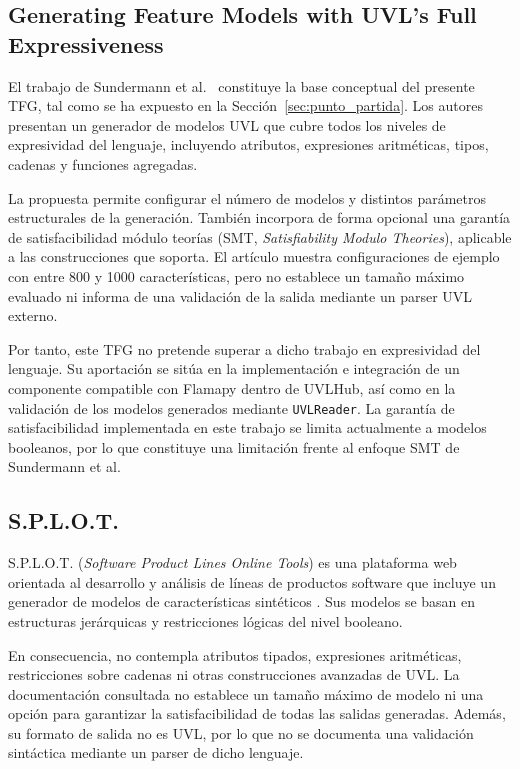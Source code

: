 \subsection{Generating Feature Models with UVL's Full Expressiveness}

El trabajo de Sundermann et al.~\cite{sundermann2024generating} constituye la
base conceptual del presente TFG, tal como se ha expuesto en la
Sección~\ref{sec:punto_partida}. Los autores presentan un generador de modelos
UVL que cubre todos los niveles de expresividad del lenguaje, incluyendo
atributos, expresiones aritméticas, tipos, cadenas y funciones agregadas.

La propuesta permite configurar el número de modelos y distintos parámetros
estructurales de la generación. También incorpora de forma opcional una
garantía de satisfacibilidad módulo teorías (SMT,
\textit{Satisfiability Modulo Theories}), aplicable a las construcciones que
soporta. El artículo muestra configuraciones de ejemplo con entre 800 y 1000
características, pero no establece un tamaño máximo evaluado ni informa de una
validación de la salida mediante un parser UVL externo.

Por tanto, este TFG no pretende superar a dicho trabajo en expresividad del
lenguaje. Su aportación se sitúa en la implementación e integración de un
componente compatible con Flamapy dentro de UVLHub, así como en la validación
de los modelos generados mediante \texttt{UVLReader}. La garantía de
satisfacibilidad implementada en este trabajo se limita actualmente a modelos
booleanos, por lo que constituye una limitación frente al enfoque SMT de
Sundermann et al.

\subsection{S.P.L.O.T.}

S.P.L.O.T. (\textit{Software Product Lines Online Tools}) es una plataforma
web orientada al desarrollo y análisis de líneas de productos software que
incluye un generador de modelos de características sintéticos
\cite{splot}. Sus modelos se basan en estructuras jerárquicas y restricciones
lógicas del nivel booleano.

En consecuencia, no contempla atributos tipados, expresiones aritméticas,
restricciones sobre cadenas ni otras construcciones avanzadas de UVL. La
documentación consultada no establece un tamaño máximo de modelo ni una opción
para garantizar la satisfacibilidad de todas las salidas generadas. Además, su
formato de salida no es UVL, por lo que no se documenta una validación sintáctica
mediante un parser de dicho lenguaje.

